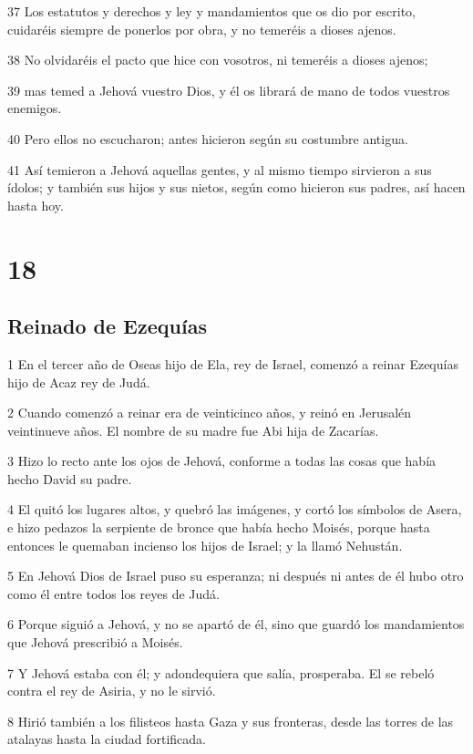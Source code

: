 \par 37 Los estatutos y derechos y ley y mandamientos que os dio por escrito, cuidaréis siempre de ponerlos por obra, y no temeréis a dioses ajenos.
\par 38 No olvidaréis el pacto que hice con vosotros, ni temeréis a dioses ajenos;
\par 39 mas temed a Jehová vuestro Dios, y él os librará de mano de todos vuestros enemigos.
\par 40 Pero ellos no escucharon; antes hicieron según su costumbre antigua.
\par 41 Así temieron a Jehová aquellas gentes, y al mismo tiempo sirvieron a sus ídolos; y también sus hijos y sus nietos, según como hicieron sus padres, así hacen hasta hoy.

\chapter{18}

\section*{Reinado de Ezequías}

\par 1 En el tercer año de Oseas hijo de Ela, rey de Israel, comenzó a reinar Ezequías hijo de Acaz rey de Judá.
\par 2 Cuando comenzó a reinar era de veinticinco años, y reinó en Jerusalén veintinueve años. El nombre de su madre fue Abi hija de Zacarías.
\par 3 Hizo lo recto ante los ojos de Jehová, conforme a todas las cosas que había hecho David su padre.
\par 4 El quitó los lugares altos, y quebró las imágenes, y cortó los símbolos de Asera, e hizo pedazos la serpiente de bronce que había hecho Moisés, porque hasta entonces le quemaban incienso los hijos de Israel; y la llamó Nehustán.
\par 5 En Jehová Dios de Israel puso su esperanza; ni después ni antes de él hubo otro como él entre todos los reyes de Judá. 
\par 6 Porque siguió a Jehová, y no se apartó de él, sino que guardó los mandamientos que Jehová prescribió a Moisés.
\par 7 Y Jehová estaba con él; y adondequiera que salía, prosperaba. El se rebeló contra el rey de Asiria, y no le sirvió.
\par 8 Hirió también a los filisteos hasta Gaza y sus fronteras, desde las torres de las atalayas hasta la ciudad fortificada.

